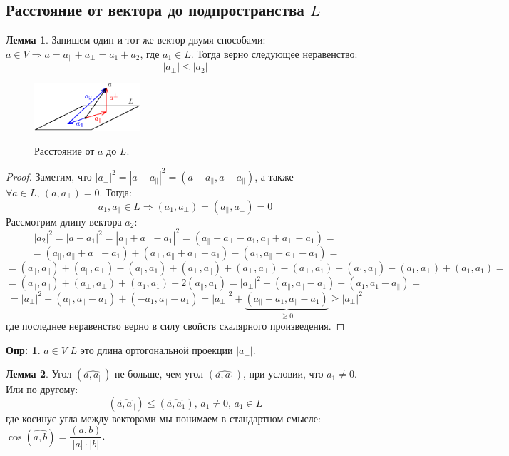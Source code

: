 \documentclass[12pt]{article}
\theoremstyle{definition}
\newtheorem{defn}{Опр:}
\newtheorem{lemma}{Лемма}
\begin{document}
\subsection*{Расстояние от вектора до подпространства $L$}
\begin{lemma}
	Запишем один и тот же вектор двумя способами: $a \in V \Rightarrow a = a_{\|} + a_\bot = a_1 + a_2$, где $a_1 \in L$. Тогда верно следующее неравенство: 
	$$
		|a_\bot| \leq |a_2|
	$$
\end{lemma}
\begin{figure}[H]
	\centering
	\includegraphics[width=0.35\textwidth]{7_1.eps}
	\label{7_1}
	\caption{Расстояние от $a$ до $L$.}
	\label{fig:Расстояние от $a$ до $L$}
\end{figure}
\begin{proof}
	Заметим, что $|a_\bot|^2 = |a - a_{\|}|^2 = (a - a_{\|}, a - a_{\|})$, а также $\forall a \in L, \, (a, a_\bot) = 0$. Тогда:
	$$
		a_1, a_{\|} \in L \Rightarrow (a_1, a_\bot) = (a_{\|}, a_\bot) = 0
	$$
	Рассмотрим длину вектора $a_2$:
	$$
		|a_2|^2 = |a - a_1|^2 = |a_{\|} + a_\bot - a_1|^2 = (a_{\|} + a_\bot - a_1,a_{\|} + a_\bot - a_1 ) = 
	$$
	$$
		=	(a_{\|}, a_{\|} + a_\bot - a_1) + (a_\bot, a_{\|} + a_\bot - a_1) - (a_1, a_{\|} + a_\bot - a_1) = 
	$$
	$$
		=(a_{\|}, a_{\|}) + (a_{\|}, a_{\bot}) - (a_{\|},a_1) + (a_{\bot}, a_{\|}) + (a_{\bot}, a_{\bot}) - (a_{\bot},a_1) - (a_1, a_{\|}) - (a_1, a_{\bot}) + (a_1,a_1) =
	$$
	$$
		 = (a_{\|},a_{\|}) + (a_\bot, a_\bot) + (a_1,a_1) - 2(a_{\|},a_1) = |a_\bot|^2 + (a_{\|},a_{\|} - a_1) + (a_1, a_1 - a_{\|}) =
	$$
	$$
		= |a_\bot|^2 + (a_{\|},a_{\|} - a_1) + (- a_1, a_{\|} - a_1)= |a_\bot|^2 + \underbrace{(a_{\|} - a_1, a_{\|} - a_1)}_{\geq 0} \geq |a_\bot|^2
	$$
	где последнее неравенство верно в силу свойств скалярного произведения.
\end{proof}
\begin{defn}
	 $a \in V$  $L$ это длина ортогональной проекции $|a_\bot|$.
\end{defn}
\begin{lemma}
	Угол $(\widehat{a,a_{\|}})$ не больше, чем угол $(\widehat{a,a_1})$, при условии, что $a_1 \neq 0$. Или по другому:
	$$
		(\widehat{a,a_{\|}}) \leq (\widehat{a,a_1}), \, a_1 \neq 0, \, a_1 \in L
	$$
	где косинус угла между векторами мы понимаем в стандартном смысле: $\cos({\widehat{a,b}}) = \dfrac{(a,b)}{|a|{\cdot}|b|}$.
\end{lemma}
\end{document}
